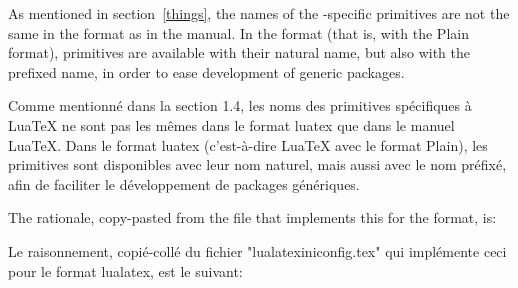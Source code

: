 \documentclass{lltxdoc}
\begin{document}
As mentioned in section~\ref{things}, the names of the \luatex-specific
primitives are not the same in the  format as in the \luatex
manual. In the  format (that is, \luatex with the Plain format),
primitives are available with their natural name, but also with the prefixed
name, in order to ease development of generic packages.

Comme mentionné dans la section 1.4, les noms des primitives spécifiques à LuaTeX ne sont pas les mêmes dans le format luatex que dans le manuel LuaTeX. Dans le format luatex (c'est-à-dire LuaTeX avec le format Plain), les primitives sont disponibles avec leur nom naturel, mais aussi avec le nom préfixé, afin de faciliter le développement de packages génériques.

The rationale, copy-pasted from the file  that
implements this for the  format, is:

Le raisonnement, copié-collé du fichier "lualatexiniconfig.tex" qui implémente ceci pour le format lualatex, est le suivant:
\end{document}
